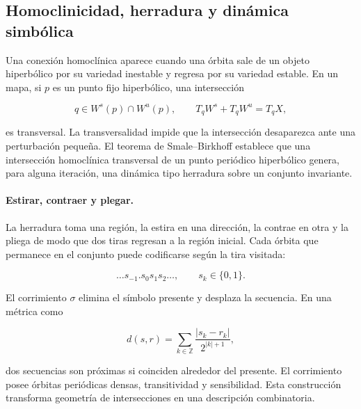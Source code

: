 
\subsection{Homoclinicidad, herradura y dinámica simbólica}

Una conexión homoclínica aparece cuando una órbita sale de un objeto hiperbólico por
su variedad inestable y regresa por su variedad estable. En un mapa, si $p$ es un
punto fijo hiperbólico, una intersección

\begin{equation}
 q\in W^s(p)\cap W^u(p),\qquad
 T_qW^s+T_qW^u=T_qX,
 \label{eq:gt-homoclinica-transversal}
\end{equation}

es transversal. La transversalidad impide que la intersección desaparezca ante una
perturbación pequeña. El teorema de Smale--Birkhoff establece que una intersección
homoclínica transversal de un punto periódico hiperbólico genera, para alguna
iteración, una dinámica tipo herradura sobre un conjunto invariante.

\paragraph{Estirar, contraer y plegar.}
La herradura toma una región, la estira en una dirección, la contrae en otra y la
pliega de modo que dos tiras regresan a la región inicial. Cada órbita que permanece
en el conjunto puede codificarse según la tira visitada:

\begin{equation}
 \ldots s_{-1}.s_0s_1s_2\ldots,\qquad s_k\in\{0,1\}.
 \label{eq:gt-codigo-simbolico}
\end{equation}

El corrimiento $\sigma$ elimina el símbolo presente y desplaza la secuencia. En una
métrica como

\begin{equation}
 d(s,r)=\sum_{k\in\mathbb Z}\frac{|s_k-r_k|}{2^{|k|+1}},
 \label{eq:gt-metrica-secuencias}
\end{equation}

dos secuencias son próximas si coinciden alrededor del presente. El corrimiento posee
órbitas periódicas densas, transitividad y sensibilidad. Esta construcción transforma
geometría de intersecciones en una descripción combinatoria.

